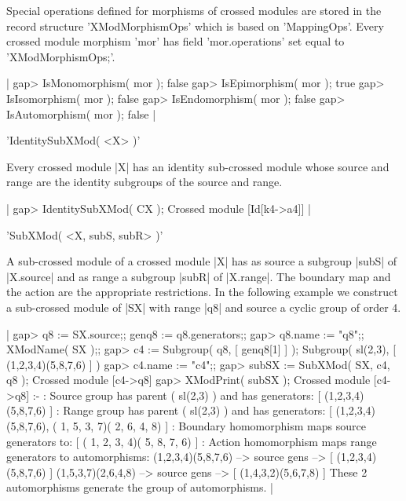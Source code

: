 %

Special operations defined for morphisms of crossed modules are stored
in  the    record structure  'XModMorphismOps'     which is  based  on
'MappingOps'.   Every  crossed    module  morphism  'mor'   has  field
'mor.operations' set equal to 'XModMorphismOps;'.

|    gap> IsMonomorphism( mor );
    false
    gap> IsEpimorphism( mor );
    true
    gap> IsIsomorphism( mor );
    false
    gap> IsEndomorphism( mor );
    false
    gap> IsAutomorphism( mor );
    false   |

%

'IdentitySubXMod( <X> )'

Every  crossed  module |X| has  an  identity sub-crossed  module whose
source and range are the identity subgroups of the source and range.

|    gap> IdentitySubXMod( CX );
    Crossed module [Id[k4->a4]]  |

%

'SubXMod( <X, subS, subR> )'

A sub-crossed module of a crossed module |X| has  as source a subgroup
|subS| of |X.source| and as range a subgroup |subR| of |X.range|.  The
boundary map and the action are  the appropriate restrictions.  In the
following example we construct a sub-crossed module of |SX| with range
|q8| and source a cyclic group of order 4.

|    gap> q8 := SX.source;; genq8 := q8.generators;;
    gap> q8.name := "q8";; XModName( SX );;
    gap> c4 := Subgroup( q8, [ genq8[1] ] );
    Subgroup( sl(2,3), [ (1,2,3,4)(5,8,7,6) ] )
    gap> c4.name := "c4";;
    gap> subSX := SubXMod( SX, c4, q8 );
    Crossed module [c4->q8] 
    gap> XModPrint( subSX );
    Crossed module [c4->q8] :- 
    : Source group has parent ( sl(2,3) ) and has generators:
      [ (1,2,3,4)(5,8,7,6) ]
    : Range group has parent ( sl(2,3) ) and has generators:
      [ (1,2,3,4)(5,8,7,6), ( 1, 5, 3, 7)( 2, 6, 4, 8) ]
    : Boundary homomorphism maps source generators to:
      [ ( 1, 2, 3, 4)( 5, 8, 7, 6) ]
    : Action homomorphism maps range generators to automorphisms:
      (1,2,3,4)(5,8,7,6) --> {source gens --> [ (1,2,3,4)(5,8,7,6) ]}
      (1,5,3,7)(2,6,4,8) --> {source gens --> [ (1,4,3,2)(5,6,7,8) ]}
      These 2 automorphisms generate the group of automorphisms.  |

